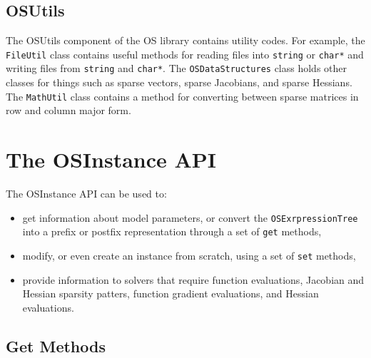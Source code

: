 \documentclass[11pt]{article}
\renewcommand{\_}{{\char"5F}}
\renewcommand{\{}{{\char"7B}}
\renewcommand{\}}{{\char"7D}}
\renewcommand{\^}{{\char"0D}}
\renewcommand{\'}{{\char"0D}}
\begin{document}
\subsection{OSUtils}

The OSUtils component of the OS library contains utility codes. For example, the {\tt FileUtil} class contains useful methods for reading files into {\tt string} or {\tt char*} and writing files from {\tt string} and {\tt char*}.  The {\tt OSDataStructures} class holds other classes for things such as sparse vectors, sparse Jacobians, and sparse Hessians. The {\tt MathUtil} class contains a method for converting between sparse matrices in row and column major form.


\section{The  OSInstance API}\label{section:osinstanceAPI}

The OSInstance API can be used to:

\begin{itemize}

\item  get information about model parameters, or convert the {\tt OSExrpressionTree} into a prefix or postfix representation through a set of {\tt get} methods,

\item modify, or even create an instance from scratch, using a set of {\tt set} methods,

\item provide information to solvers that require function evaluations, Jacobian and Hessian sparsity patters,  function gradient evaluations, and Hessian evaluations.

\end{itemize}



\subsection{Get Methods}
\end{document}
